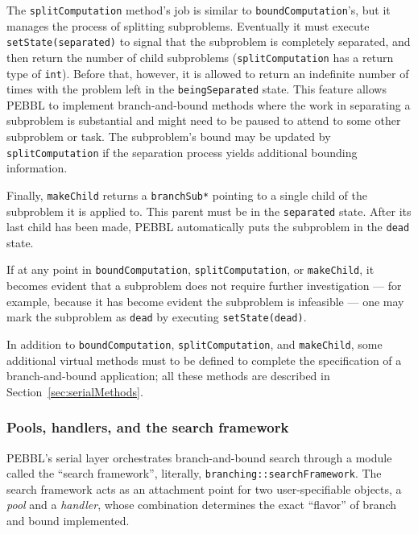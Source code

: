 The \texttt{splitComputation} method's job is similar to
\texttt{boundComputation}'s, but it manages the process of splitting
subproblems.  Eventually it must execute \texttt{setState(separated)}
to signal that the subproblem is completely separated, and then return
the number of child subproblems (\texttt{splitComputation} has a
return type of \texttt{int}).  Before that, however, it is allowed to
return an indefinite number of times with the problem left in the
\texttt{beingSeparated} state.  This feature allows PEBBL to implement
branch-and-bound methods where the work in separating a subproblem is
substantial and might need to be paused to attend to some other
subproblem or task.  The subproblem's bound may be updated by
\texttt{splitComputation} if the separation process yields additional
bounding information.

Finally, \texttt{makeChild} returns a \texttt{branchSub*} pointing to
a single child of the subproblem it is applied to.  This parent must
be in the \texttt{separated} state.  After its last child has been
made, PEBBL automatically puts the subproblem in the \texttt{dead}
state.

If at any point in \texttt{boundComputation},
\texttt{splitComputation}, or \texttt{makeChild}, it becomes evident
that a subproblem does not require further investigation --- for
example, because it has become evident the subproblem is infeasible
--- one may mark the subproblem as \texttt{dead} by executing
\texttt{setState(dead)}.

In addition to \texttt{boundComputation}, \texttt{splitComputation},
and \texttt{makeChild}, some additional virtual methods must to be
defined to complete the specification of a branch-and-bound
application; all these methods are described in
Section~\ref{sec:serialMethods}.


\subsubsection{Pools, handlers, and the search framework}
\label{sec:framework}

PEBBL's serial layer orchestrates branch-and-bound search through a
module called the ``search framework'', literally,
\texttt{branching::searchFramework}.  The search framework acts as an
attachment point for two user-specifiable objects, a \emph{pool} and
a \emph{handler}, whose combination determines the exact ``flavor''
of branch and bound implemented.

